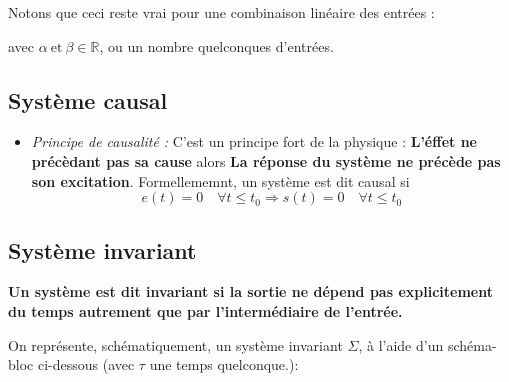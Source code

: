 \begin{itemize}
    Notons que ceci reste vrai pour une combinaison linéaire des entrées :
    \begin{center}
    \end{center}
    avec $\alpha\ \text{et}\ \beta\in\mathbb{R}$, ou un nombre quelconques d'entrées.
\end{itemize}

\subsection{Système causal}
\begin{itemize}
    \item \emph{Principe de causalité :}
        C'est un principe fort de la physique :
        \textbf{\og L'éffet ne précèdant pas sa cause\fg} alors 
        \textbf{\og La réponse du système ne précède pas son excitation\fg}.
        Formellememnt, un système est dit causal si 
        $$e(t)=0\quad\forall t\le t_0 \Rightarrow s(t)=0\quad\forall t\le t_0 $$  
\end{itemize}

\subsection{Système invariant}
\textbf{Un système est dit invariant si la sortie ne dépend pas 
explicitement du temps autrement que par l'intermédiaire de l'entrée.}

On représente, schématiquement, un système invariant $\Sigma$, à 
l'aide d'un schéma-bloc ci-dessous 
(avec $\tau$ une temps quelconque.): 
\begin{center}
\end{center}

